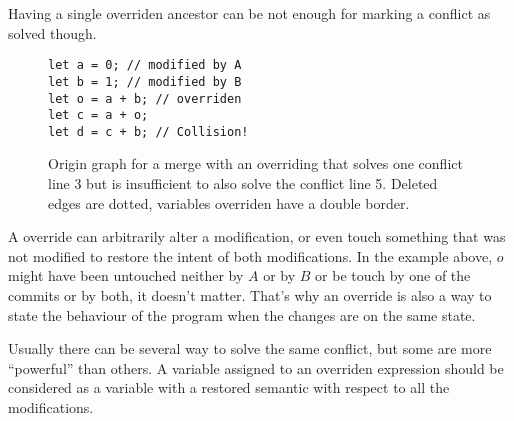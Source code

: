 \documentclass[a4paper,10pt]{article}
\begin{document}
Having a single overriden ancestor can be not enough for marking a conflict as solved though.

\begin{figure}[ht]
\begin{minipage}{.5\textwidth}
\begin{lstlisting}
let a = 0; // modified by A
let b = 1; // modified by B
let o = a + b; // overriden
let c = a + o;
let d = c + b; // Collision!
\end{lstlisting}
\end{minipage}\hfill
\begin{minipage}{.45\textwidth}
\centering{}
\end{minipage}
\caption{Origin graph for a merge with an overriding that solves one conflict line 3 but is insufficient to also solve the conflict line 5. Deleted edges are dotted, variables overriden have a double border.}
\end{figure}

A override can arbitrarily alter a modification, or even touch something that was not modified to restore the intent of both modifications. In the example above, $o$ might have been untouched neither by $A$ or by $B$ or be touch by one of the commits or by both, it doesn't matter. That's why an override is also a way to state the behaviour of the program when the changes are on the same state.

Usually there can be several way to solve the same conflict, but some are more ``powerful'' than others. A variable assigned to an overriden expression should be considered as a variable with a restored semantic with respect to all the modifications.
\end{document}
